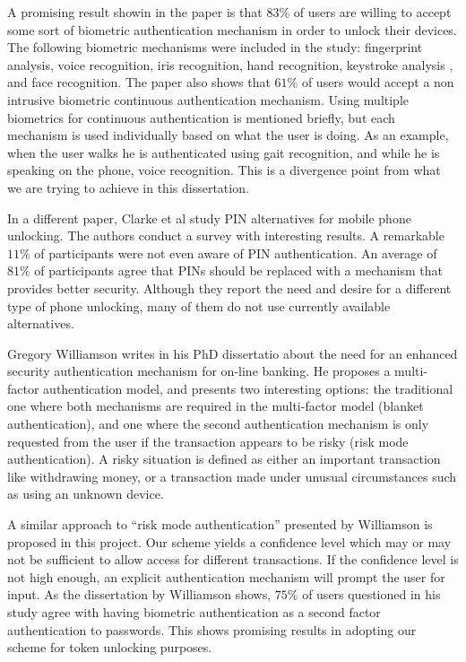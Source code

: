 A promising result showin in the paper is that $83\%$ of users are willing to accept some sort of biometric authentication mechanism in order to unlock their devices. The following biometric mechanisms were included in the study: fingerprint analysis, voice recognition, iris recognition, hand recognition, keystroke analysis \cite{clarke2003using}, and face recognition. The paper also shows that $61\%$ of users would accept a non intrusive biometric continuous authentication mechanism. Using multiple biometrics for continuous authentication is mentioned briefly, but each mechanism is used individually based on what the user is doing. As an example, when the user walks he is authenticated using gait recognition, and while he is speaking on the phone, voice recognition. This is a divergence point from what we are trying to achieve in this dissertation.

In a different paper, Clarke et al \cite{clarke2002acceptance} study PIN alternatives for mobile phone unlocking. The authors conduct a survey with interesting results. A remarkable $11\%$ of participants were not even aware of PIN authentication. An average of $81\%$ of participants agree that PINs should be replaced with a mechanism that provides better security. Although they report the need and desire for a different type of phone unlocking, many of them do not use currently available alternatives.

Gregory Williamson \cite{williamson2006enhanced} writes in his PhD dissertatio  about the need for an enhanced security authentication mechanism for on-line banking. He proposes a multi-factor authentication model, and presents two interesting options: the traditional one where both mechanisms are required in the multi-factor model (blanket authentication), and one where the second authentication mechanism is only requested from the user if the transaction appears to be risky (risk mode authentication). A risky situation is defined as either an important transaction like withdrawing money, or a transaction made under unusual circumstances such as using an unknown device. 

A similar approach to ``risk mode authentication'' presented by Williamson \cite{williamson2006enhanced} is proposed in this project. Our scheme yields a confidence level which may or may not be sufficient to allow access for different transactions. If the confidence level is not high enough, an explicit authentication mechanism will prompt the user for input. As the dissertation by Williamson shows, $75\%$ of users questioned in his study agree with having biometric authentication as a second factor authentication to passwords. This shows promising results in adopting our scheme for token unlocking purposes.

